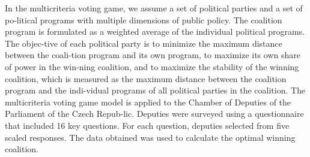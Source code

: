 
\begin{Abstrakt}
    In the multicriteria voting game, we assume a set of political parties and a set of po-litical programs with multiple dimensions of public policy. The coalition program is formulated as a weighted average of the individual political programs. The objec-tive of each political party is to minimize the maximum distance between the coali-tion program and its own program, to maximize its own share of power in the win-ning coalition, and to maximize the stability of the winning coalition, which is measured as the maximum distance between the coalition program and the indi-vidual programs of all political parties in the coalition. The multicriteria voting game model is applied to the Chamber of Deputies of the Parliament of the Czech Repub-lic. Deputies were surveyed using a questionnaire that included 16 key questions. For each question, deputies selected from five scaled responses. The data obtained was used to calculate the optimal winning coalition.
\end{Abstrakt}



\clearpage